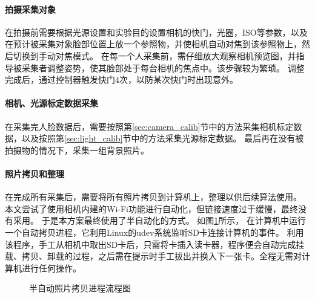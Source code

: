 \paragraph{拍摄采集对象}
在拍摄前需要根据光源设置和实验目的设置相机的快门，光圈，ISO等参数，以及在预计被采集对象脸部位置上放一个参照物，并使相机自动对焦到该参照物上，然后切换到手动对焦模式。
在每一个人采集前，需仔细放大观察相机预览图，并指导被采集者调整姿势，使其脸部处于每台相机的焦点中。该步骤较为繁琐。
调整完成后，通过控制器触发快门4次，以防某次快门时出现意外。

\paragraph{相机、光源标定数据采集}
在采集完人脸数据后，需要按照第\ref{sec:camera_calib}节中的方法采集相机标定数据，以及按照第\ref{sec:light_calib}节中的方法采集光源标定数据。
最后再在没有被拍摄物的情况下，采集一组背景照片。

\paragraph{照片拷贝和整理}
在完成所有采集后，需要将所有照片拷贝到计算机上，整理以供后续算法使用。
本文尝试了使用相机内建的Wi-Fi功能进行自动化，但链接速度过于缓慢，最终没有采用。
于是本方案最终使用了半自动化的方式。
如图\ref{fig:copy_photo}所示，
在计算机中运行一个自动拷贝进程，它利用Linux的udev系统监听SD卡连接计算机的事件。
利用该程序，手工从相机中取出SD卡后，只需将卡插入读卡器，程序便会自动完成挂载、拷贝、卸载的过程，之后需在提示时手工拔出并换入下一张卡。全程无需对计算机进行任何操作。
\begin{figure}[htbp]
\centering
{}
\caption{半自动照片拷贝进程流程图}
\label{fig:copy_photo}
\end{figure}

